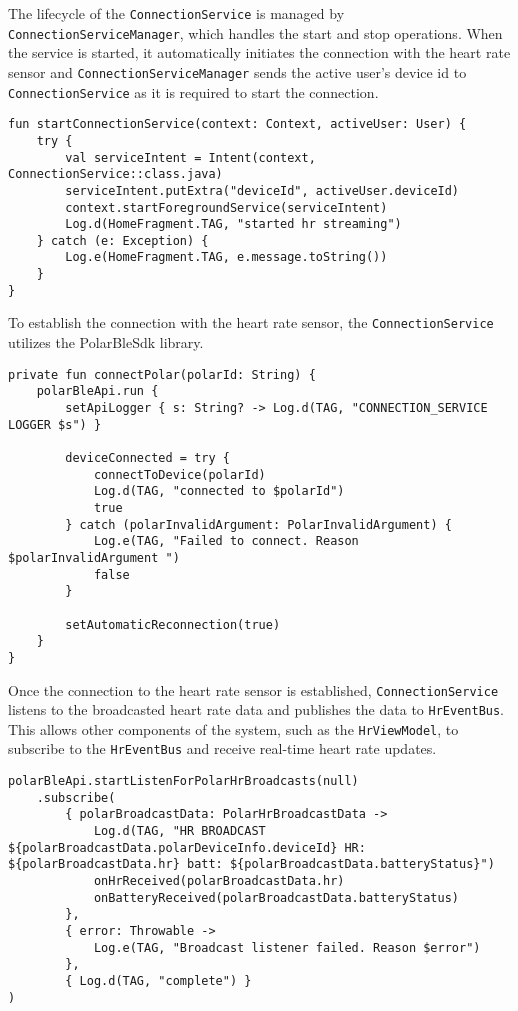 The lifecycle of the \verb;ConnectionService; is managed by \verb;ConnectionServiceManager;, which handles the start and stop operations. 
When the service is started, it automatically initiates the connection with the heart rate sensor and \verb;ConnectionServiceManager; sends the active user's device id to \verb;ConnectionService; as it is required to start the connection. 
\begin{lstlisting}[caption={Function to start ConnectionService (Kotlin - ConnectionServiceManager)}]
fun startConnectionService(context: Context, activeUser: User) {
    try {
        val serviceIntent = Intent(context, ConnectionService::class.java)
        serviceIntent.putExtra("deviceId", activeUser.deviceId)
        context.startForegroundService(serviceIntent)
        Log.d(HomeFragment.TAG, "started hr streaming")
    } catch (e: Exception) {
        Log.e(HomeFragment.TAG, e.message.toString())
    }
}
\end{lstlisting}

To establish the connection with the heart rate sensor, the \verb;ConnectionService; utilizes the PolarBleSdk library.
\begin{lstlisting}[caption={Function to initiate connection to heart rate sensor (ConnectionService)}]
private fun connectPolar(polarId: String) {
    polarBleApi.run {
        setApiLogger { s: String? -> Log.d(TAG, "CONNECTION_SERVICE LOGGER $s") }

        deviceConnected = try {
            connectToDevice(polarId)
            Log.d(TAG, "connected to $polarId")
            true
        } catch (polarInvalidArgument: PolarInvalidArgument) {
            Log.e(TAG, "Failed to connect. Reason $polarInvalidArgument ")
            false
        }

        setAutomaticReconnection(true)
    }
}
\end{lstlisting}

Once the connection to the heart rate sensor is established, \verb;ConnectionService; listens to the broadcasted heart rate data and publishes the data to \verb;HrEventBus;.
This allows other components of the system, such as the \verb;HrViewModel;, to subscribe to the \verb;HrEventBus; and receive real-time heart rate updates. 
\begin{lstlisting}[caption={Heart rate data broadcast listener (ConnectionService)}]
polarBleApi.startListenForPolarHrBroadcasts(null)
    .subscribe(
        { polarBroadcastData: PolarHrBroadcastData ->
            Log.d(TAG, "HR BROADCAST ${polarBroadcastData.polarDeviceInfo.deviceId} HR: ${polarBroadcastData.hr} batt: ${polarBroadcastData.batteryStatus}")
            onHrReceived(polarBroadcastData.hr)
            onBatteryReceived(polarBroadcastData.batteryStatus)
        },
        { error: Throwable ->
            Log.e(TAG, "Broadcast listener failed. Reason $error")
        },
        { Log.d(TAG, "complete") }
)
\end{lstlisting}

